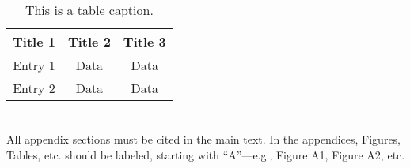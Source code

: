 \documentclass[journal,article,submit,pdftex,moreauthors]{Definitions/mdpi}
\begin{document}
\begin{table}[H] 
\caption{This is a table caption.\label{tab5}}
\centering
\begin{tabular}{ccc}
\toprule
\textbf{Title 1}	& \textbf{Title 2}	& \textbf{Title 3}\\
\midrule
Entry 1		& Data			& Data\\
Entry 2		& Data			& Data\\
\bottomrule
\end{tabular}
\end{table}

\section[\appendixname~\thesection]{}
All appendix sections must be cited in the main text. In the appendices, Figures, Tables, etc. should be labeled, starting with ``A''---e.g., Figure A1, Figure A2, etc.
\end{document}
